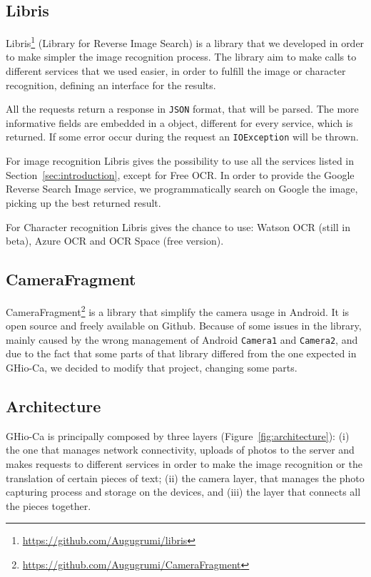 \subsection{Libris}
Libris\footnote{\url{https://github.com/Augugrumi/libris}} (Library for Reverse
Image Search) is a library that we developed in order to make 
simpler the image recognition process. The library aim to make calls to 
different services that we used easier, in order to fulfill the image or 
character recognition, defining an interface for the results.

All the requests return a response in \texttt{JSON} format, that will be parsed.
The more informative fields are embedded in a object, different for every
service, which is returned. If some error occur during the request an
\texttt{IOException} will be thrown.

For image recognition Libris gives the possibility to use all the services
listed in Section~\ref{sec:introduction}, except for Free OCR. In order to
provide the Google Reverse Search Image service, we programmatically search on
Google the image, picking up the best returned result.

For Character recognition Libris gives the chance to use: Watson OCR (still in
beta), Azure OCR and OCR Space (free version).

\subsection{CameraFragment}
CameraFragment\footnote{\url{https://github.com/Augugrumi/CameraFragment}} is a
library that simplify the camera usage in Android. It is
open source and freely available on Github. Because of some issues in the
library, mainly caused by the wrong management of Android \texttt{Camera1} and
\texttt{Camera2}, and due to the fact that some parts of that library differed
from the one expected in GHio-Ca, we decided to modify that project, changing
some parts.

\subsection{Architecture}
GHio-Ca is principally composed by three layers (Figure~\ref{fig:architecture}):
(i) the one that manages network connectivity, uploads of photos to the server
and makes requests to different services in order to make the image recognition
or the translation of certain pieces of text; (ii) the camera layer, that
manages the photo capturing process and storage on the devices, and (iii) the
layer that
connects all the pieces together.

